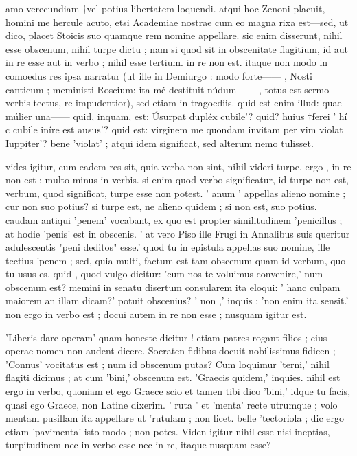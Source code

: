 


 amo verecundiam †vel potius libertatem loquendi. atqui hoc Zenoni placuit, homini me hercule acuto, etsi Academiae nostrae cum eo magna rixa est—sed, ut dico, placet Stoicis suo quamque rem nomine appellare. sic enim disserunt, nihil esse obscenum, nihil turpe dictu ; nam si quod sit in obscenitate flagitium, id aut in re esse aut in verbo ; nihil esse tertium. in re non est. itaque non modo in comoedus res ipsa narratur (ut ille in Demiurgo : modo forte—— , Nosti canticum ; meministi Roscium: ita mé destituit núdum—— , totus est sermo verbis tectus, re impudentior), sed etiam in tragoediis. quid est enim illud: quae múlier una—— quid, inquam, est: Úsurpat dupléx cubile'? quid? huius †ferei ' hí c cubile iníre est ausus'? quid est: virginem me quondam invitam per vim violat Iuppiter'? bene 'violat' ; atqui idem significat, sed alterum nemo tulisset.

 vides igitur, cum eadem res sit, quia verba non sint, nihil videri turpe. ergo , in re non est ; multo minus in verbis. si enim quod verbo significatur, id turpe non est, verbum, quod significat, turpe esse non potest. ' anum ' appellas alieno nomine ; cur non suo potius? si turpe est, ne alieno quidem ; si non est, suo potius. caudam antiqui 'penem' vocabant, ex quo est propter similitudinem 'penicillus ; at hodie 'penis' est in obscenis. ' at vero Piso ille Frugi in Annalibus suis queritur adulescentis "peni deditos" esse.' quod tu in epistula appellas suo nomine, ille tectius 'penem ; sed, quia multi, factum est tam obscenum quam id verbum, quo tu usus es. quid , quod vulgo dicitur: 'cum nos te voluimus convenire,' num obscenum est? memini in senatu disertum consularem ita eloqui: ' hanc culpam maiorem an illam dicam?' potuit obscenius? ' non ,' inquis ; 'non enim ita sensit.' non ergo in verbo est ; docui autem in re non esse ; nusquam igitur est.

 'Liberis dare operam' quam honeste dicitur ! etiam patres rogant filios ; eius operae nomen non audent dicere. Socraten fidibus docuit nobilissimus fidicen ; 'Connus' vocitatus est ; num id obscenum putas? Cum loquimur 'terni,' nihil flagiti dicimus ; at cum 'bini,' obscenum est. 'Graecis quidem,' inquies. nihil est ergo in verbo, quoniam et ego Graece scio et tamen tibi dico 'bini,' idque tu facis, quasi ego Graece, non Latine dixerim. ' ruta ' et 'menta' recte utrumque ; volo mentam pusillam ita appellare ut 'rutulam ; non licet. belle 'tectoriola ; dic ergo etiam 'pavimenta' isto modo ; non potes. Viden igitur nihil esse nisi ineptias, turpitudinem nec in verbo esse nec in re, itaque nusquam esse?

